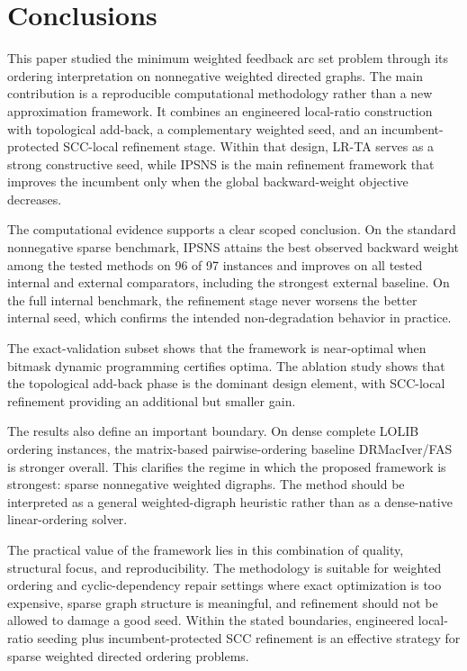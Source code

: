 \section{Conclusions}
\label{sec:conclusion}

This paper studied the minimum weighted feedback arc set problem through its ordering interpretation on nonnegative weighted directed graphs. The main contribution is a reproducible computational methodology rather than a new approximation framework. It combines an engineered local-ratio construction with topological add-back, a complementary weighted seed, and an incumbent-protected SCC-local refinement stage. Within that design, LR-TA serves as a strong constructive seed, while IPSNS is the main refinement framework that improves the incumbent only when the global backward-weight objective decreases.

The computational evidence supports a clear scoped conclusion. On the standard nonnegative sparse benchmark, IPSNS attains the best observed backward weight among the tested methods on 96 of 97 instances and improves on all tested internal and external comparators, including the strongest external baseline. On the full internal benchmark, the refinement stage never worsens the better internal seed, which confirms the intended non-degradation behavior in practice.

The exact-validation subset shows that the framework is near-optimal when bitmask dynamic programming certifies optima. The ablation study shows that the topological add-back phase is the dominant design element, with SCC-local refinement providing an additional but smaller gain.

The results also define an important boundary. On dense complete LOLIB ordering instances, the matrix-based pairwise-ordering baseline DRMacIver/FAS is stronger overall. This clarifies the regime in which the proposed framework is strongest: sparse nonnegative weighted digraphs. The method should be interpreted as a general weighted-digraph heuristic rather than as a dense-native linear-ordering solver.

The practical value of the framework lies in this combination of quality, structural focus, and reproducibility. The methodology is suitable for weighted ordering and cyclic-dependency repair settings where exact optimization is too expensive, sparse graph structure is meaningful, and refinement should not be allowed to damage a good seed. Within the stated boundaries, engineered local-ratio seeding plus incumbent-protected SCC refinement is an effective strategy for sparse weighted directed ordering problems.

